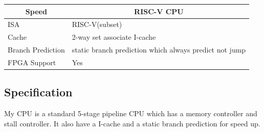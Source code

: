 \documentclass[12pt, a4paper]{article}
\theoremstyle{margin}
\begin{document}
\begin{table}[H]
\centering
\begin{tabular}{@{}ll@{}}
\toprule
\multicolumn{1}{c}{Speed} & \multicolumn{1}{c}{RISC-V CPU}                                                                        \\ \midrule
ISA                         & RISC-V(subset) \\
Cache                       & 2-way set associate I-cache\\
Branch Prediction           & static branch prediction which always predict not jump\\
FPGA Support                & Yes\\
 \bottomrule
\end{tabular}
\end{table}

\fi

\subsection{Specification}

My CPU is a standard 5-stage pipeline CPU which has a memory controller and stall controller. It also have a I-cache  and a static branch prediction for speed up.
\end{document}
